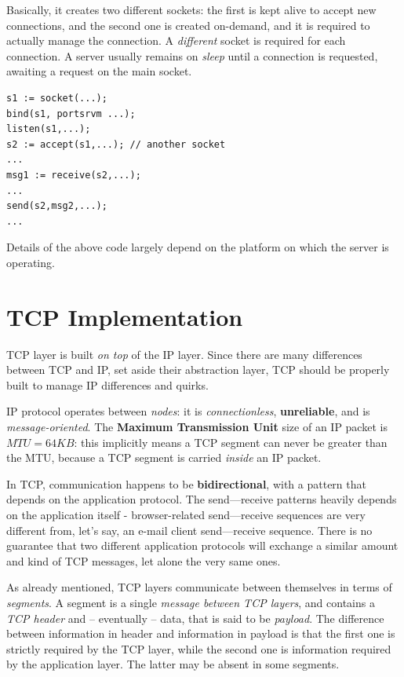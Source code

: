 \documentclass[10pt]{book}
\begin{document}
Basically, it creates two different sockets: the first is kept alive to accept
new connections, and the second one is created on-demand, and it is required to
actually manage the connection. A \emph{different} socket is required for each
connection. A server usually remains on \emph{sleep} until a connection is
requested, awaiting a request on the main socket.

\begin{verbatim} 
s1 := socket(...);
bind(s1, portsrvm ...);
listen(s1,...);
s2 := accept(s1,...); // another socket
... 
msg1 := receive(s2,...);
...
send(s2,msg2,...);
... 
\end{verbatim}

Details of the above code largely depend on the platform on which the server is
operating.

\section{TCP Implementation}

TCP layer is built \emph{on top} of the IP layer. Since there are many differences
between TCP and IP, set aside their abstraction layer, TCP should be properly
built to manage IP differences and quirks. 

IP protocol operates between \emph{nodes}: it is \emph{connectionless},
\textbf{unreliable}, and is \emph{message-oriented}. The \textbf{Maximum
Transmission Unit} size of an IP packet is $MTU = 64KB$: this implicitly means
a TCP segment can never be greater than the MTU, because a TCP segment is
carried \emph{inside} an IP packet.

In TCP, communication happens to be \textbf{bidirectional}, with a pattern that
depends on the application protocol. The send\----receive patterns heavily depends
on the application itself \-- browser-related send\----receive sequences are
very different from, let's say, an e-mail client send\----receive sequence.
There is no guarantee that two different application protocols will exchange a
similar amount and kind of TCP messages, let alone the very same ones.

As already mentioned, TCP layers communicate between themselves in terms of
\emph{segments}. A segment is a single \emph{message between TCP layers}, and
contains a \emph{TCP header} and \--- eventually \--- data, that is said to be
\emph{payload}. The difference between information in header and information in
payload is that the first one is strictly required by the TCP layer, while the
second one is information required by the application layer. The latter may be
absent in some segments.
\end{document}
